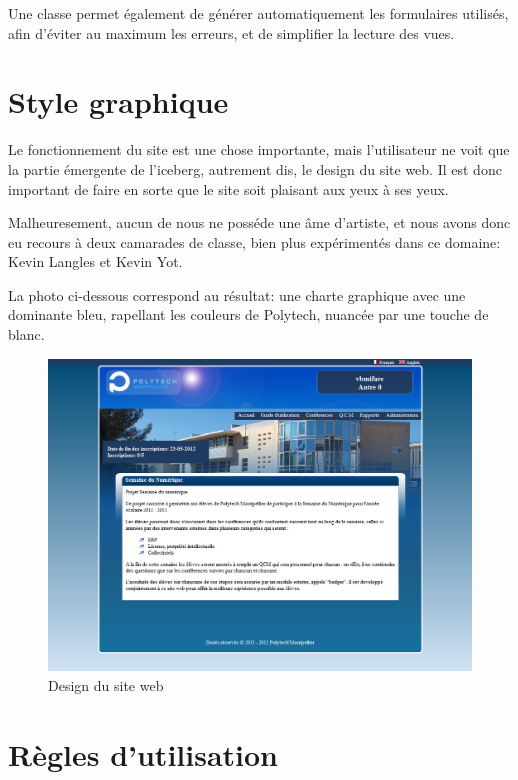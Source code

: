 Une classe permet également de générer automatiquement les formulaires utilisés, afin d'éviter au maximum les erreurs,
et de simplifier la lecture des vues.




    \section{Style graphique}
Le fonctionnement du site est une chose importante, mais l'utilisateur ne voit que
la partie émergente de l'iceberg, autrement dis, le design du site web. Il est donc
important de faire en sorte que le site soit plaisant aux yeux à ses yeux. 

Malheuresement, aucun de nous ne posséde une âme d'artiste, et nous avons donc eu
recours à deux camarades de classe, bien plus expérimentés dans ce domaine: Kevin
Langles et Kevin Yot.

La photo ci-dessous correspond au résultat: une charte graphique avec une dominante 
bleu, rapellant les couleurs de Polytech, nuancée par une touche de blanc.

    \begin{figure}[h]
        \begin{center}
        \includegraphics[scale=0.4]{images/screenSiteWeb.png} 
        \end{center}
        \caption{Design du site web}
        \label{Design du site web}
    \end{figure}



    \section{Règles d'utilisation}

